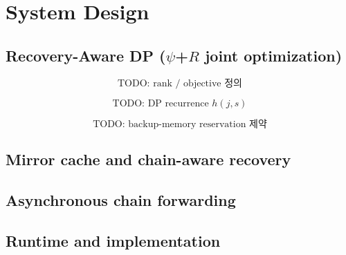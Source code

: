 \section{System Design}\label{sec:design}

\subsection{Recovery-Aware DP ($\psi$+$R$ joint optimization)}\label{sec:design:dp}

\begin{equation}\label{eq:rank}
  \text{TODO: rank / objective 정의}
\end{equation}

\begin{equation}\label{eq:dp}
  \text{TODO: DP recurrence } h(j,s)
\end{equation}

\begin{equation}\label{eq:mem}
  \text{TODO: backup-memory reservation 제약}
\end{equation}

\begin{algorithm}[t]
  \caption{Alternating $\psi$+$R$ optimization}
  \label{alg:alt}
  \begin{algorithmic}[1]
    \State {}
  \end{algorithmic}
\end{algorithm}

\subsection{Mirror cache and chain-aware recovery}\label{sec:design:mirror}

\subsection{Asynchronous chain forwarding}\label{sec:design:async}

\subsection{Runtime and implementation}\label{sec:design:runtime}
